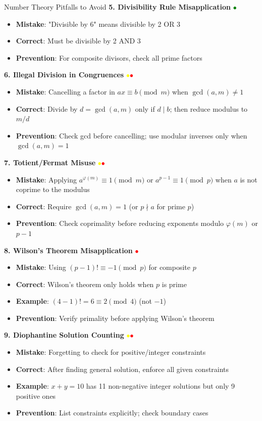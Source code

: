 \documentclass{article}
\begin{document}
\begin{trapbox}{Number Theory Pitfalls to Avoid}
\textbf{5. Divisibility Rule Misapplication} \textcolor{green}{$\bullet$}
\begin{itemize}[nosep]
\item \textbf{Mistake}: "Divisible by 6" means divisible by 2 OR 3
\item \textbf{Correct}: Must be divisible by 2 AND 3
\item \textbf{Prevention}: For composite divisors, check all prime factors
\end{itemize}
\textbf{6. Illegal Division in Congruences} \textcolor{yellow}{$\bullet$}\textcolor{red}{$\bullet$}
\begin{itemize}[nosep]
\item \textbf{Mistake}: Cancelling a factor in $ax \equiv b \pmod m$ when $\gcd(a,m)\ne 1$
\item \textbf{Correct}: Divide by $d=\gcd(a,m)$ only if $d\mid b$; then reduce modulus to $m/d$
\item \textbf{Prevention}: Check gcd before cancelling; use modular inverses only when $\gcd(a,m)=1$
\end{itemize}
\textbf{7. Totient/Fermat Misuse} \textcolor{yellow}{$\bullet$}\textcolor{red}{$\bullet$}
\begin{itemize}[nosep]
\item \textbf{Mistake}: Applying $a^{\varphi(m)} \equiv 1 \pmod m$ or $a^{p-1} \equiv 1 \pmod p$ when $a$ is not coprime to the modulus
\item \textbf{Correct}: Require $\gcd(a,m)=1$ (or $p \nmid a$ for prime $p$)
\item \textbf{Prevention}: Check coprimality before reducing exponents modulo $\varphi(m)$ or $p-1$
\end{itemize}

\textbf{8. Wilson's Theorem Misapplication} \textcolor{red}{$\bullet$}
\begin{itemize}[nosep]
\item \textbf{Mistake}: Using $(p-1)! \equiv -1 \pmod p$ for composite $p$
\item \textbf{Correct}: Wilson's theorem only holds when $p$ is prime
\item \textbf{Example}: $(4-1)! = 6 \equiv 2 \pmod 4$ (not $-1$)
\item \textbf{Prevention}: Verify primality before applying Wilson's theorem
\end{itemize}

\textbf{9. Diophantine Solution Counting} \textcolor{yellow}{$\bullet$}\textcolor{red}{$\bullet$}
\begin{itemize}[nosep]
\item \textbf{Mistake}: Forgetting to check for positive/integer constraints
\item \textbf{Correct}: After finding general solution, enforce all given constraints
\item \textbf{Example}: $x+y=10$ has 11 non-negative integer solutions but only 9 positive ones
\item \textbf{Prevention}: List constraints explicitly; check boundary cases
\end{itemize}


\end{trapbox}
\end{document}
